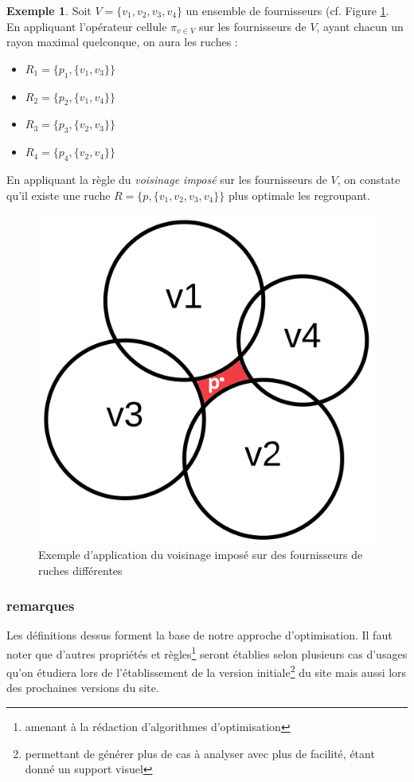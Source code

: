 \documentclass[a4paper,12pt]{book}
\theoremstyle{break}
\theoremstyle{break}
\theoremstyle{break}
\theoremstyle{break}
\theoremstyle{definition}
\newtheorem*{example}{Exemple}
\theoremstyle{remark}
\begin{document}
\begin{example}
Soit $V = \{v_1, v_2, v_3, v_4\}$ un ensemble de fournisseurs (cf. Figure \ref{fig:exemple_introductif_2}.\\
En appliquant l'opérateur cellule $\pi_{v \in V}$ sur les fournisseurs de $V$, ayant chacun un rayon maximal quelconque, on aura les ruches :
\begin{itemize}
  \item{$R_1 = \{p_1, \{v_1, v_3\}\}$}
  \item{$R_2 = \{p_2, \{v_1, v_4\}\}$}
  \item{$R_3 = \{p_3, \{v_2, v_3\}\}$}
  \item{$R_4 = \{p_4, \{v_2, v_4\}\}$}
\end{itemize}
En appliquant la règle du \textit{voisinage imposé} sur les fournisseurs de $V$, on constate qu'il existe une ruche $R=\{p, \{v_1, v_2, v_3, v_4\}\}$ plus optimale les regroupant.

\begin{figure}
  \centering
  \includegraphics[scale=0.15]{images/exemple_introductif2.png}
  \caption{Exemple d'application du voisinage imposé sur des fournisseurs de ruches différentes}
  \label{fig:exemple_introductif_2}
\end{figure}
\end{example}

\subsubsection{remarques}
Les définitions dessus forment la base de notre approche d'optimisation. Il faut noter que d'autres propriétés et règles\footnote{amenant à la rédaction d'algorithmes d'optimisation} seront établies selon plusieurs cas d'usages qu'on étudiera lors de l'établissement de la version initiale\footnote{permettant de générer plus de cas à analyser avec plus de facilité, étant donné un support visuel} du site mais aussi lors des prochaines versions du site.
\end{document}
